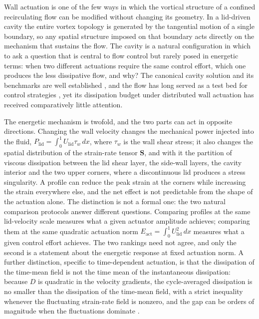 \documentclass[11pt,a4paper]{article}
\newcommand{\Eact}{E_{\mathrm{act}}}
\newcommand{\Plid}{P_{\mathrm{lid}}}
\newcommand{\Sij}{\mathbf{S}}
\newenvironment{chgadd}{\par\color{blue}}{\par\color{black}}
\begin{document}
\begin{chgadd}
Wall actuation is one of the few ways in which the vortical structure of a
confined recirculating flow can be modified without changing its geometry. In a
lid-driven cavity the entire vortex topology is generated by the tangential
motion of a single boundary, so any spatial structure imposed on that boundary
acts directly on the mechanism that sustains the flow. The cavity is a
natural configuration in which to ask a question that is central to flow control
but rarely posed in energetic terms: when two different actuations require the
same control effort, which one produces the less dissipative flow, and why?
The canonical cavity solution and its benchmarks are well established
\cite{ghia1982high,botella1998benchmark,shankardeshpande2000,albensoeder2005accurate,kuhlmann2019},
and the flow has long served as a test bed for control strategies
\cite{gadelhak2000,brunton2015closed,rowley2017model,bewley2001dns,bergmann2005optimal,choi1994active,quadrio2004critical,rabsult2019drl,garnier2021drl}, yet its dissipation budget under
distributed wall actuation has received comparatively little attention.

The energetic mechanism is twofold, and the two parts can act in opposite
directions. Changing the wall velocity changes the mechanical power injected into
the fluid,
$\Plid=\int_0^1 U_{\mathrm{lid}}\tau_w\,dx$, where $\tau_w$ is the wall shear
stress; it also changes the spatial distribution of the strain-rate tensor
$\Sij$, and with it the partition of viscous dissipation between the lid shear
layer, the side-wall layers, the cavity interior and the two upper corners, where
a discontinuous lid produces a stress singularity. A profile can reduce
the peak strain at the corners while increasing the strain everywhere else, and
the net effect is not predictable from the shape of the actuation alone. The
distinction is not a formal one: the two natural comparison protocols answer different
questions. Comparing profiles at the same lid-velocity scale
\cite{beniaiche2026} measures what a given actuator amplitude achieves; comparing
them at the same quadratic actuation norm
$\Eact=\int_0^1U_{\mathrm{lid}}^2\,dx$ measures what a given control effort
achieves. The two rankings need not agree, and only the second is a statement
about the energetic response at fixed actuation norm. A further distinction, specific to time-dependent actuation, is
that the dissipation of the time-mean field is not the time mean of the
instantaneous dissipation: because $D$ is quadratic in the velocity gradients, the
cycle-averaged dissipation is no smaller than the dissipation of the time-mean
field, with a strict inequality whenever the fluctuating strain-rate field is
nonzero, and
the gap can be orders of magnitude when the fluctuations dominate
\cite{pope2000,landau1987,doering2002energy,beneddine2016conditions}.


\end{chgadd}
\end{document}
